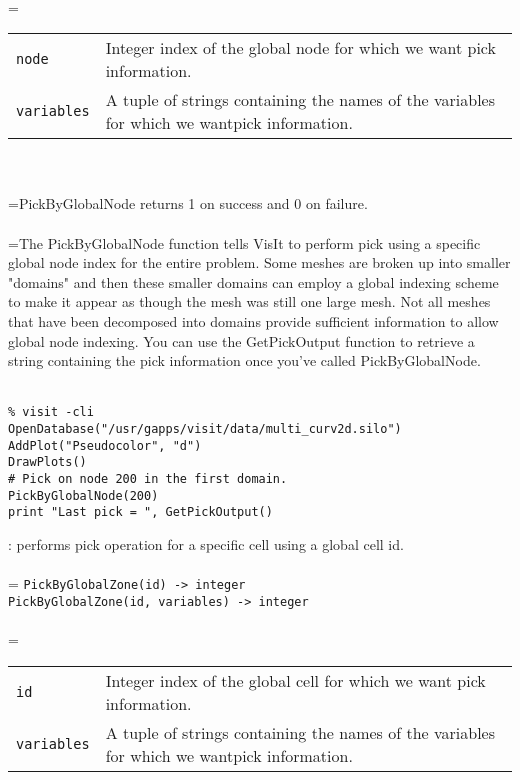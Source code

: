 \documentclass[10pt,a4paper]{report}
\begin{document}
 \\ 
\hangindent=\parindent 
\begin{tabular}{lp{9cm}}
\verb!node! & Integer index of the global node for which we want pick information. \\
\verb!variables! & A tuple of strings containing the names of the variables for which we wantpick information. \\
\end{tabular} \\[-2mm]


 \\ 
\hangindent=\parindent PickByGlobalNode returns 1 on success and 0 on failure. \\[-3mm] 

 \\ 
\hangindent=\parindent The PickByGlobalNode function tells VisIt to perform pick using a specific global node index for the entire problem. Some meshes are broken up into smaller "domains" and then these smaller domains can employ a global indexing scheme to make it appear as though the mesh was still one large mesh. Not all meshes that have been decomposed into domains provide sufficient information to allow global node indexing. You can use the GetPickOutput function to retrieve a string containing the pick information once you've called PickByGlobalNode. \\[-3mm] 

\\[-6mm]
\begin{verbatim}% visit -cli
OpenDatabase("/usr/gapps/visit/data/multi_curv2d.silo")
AddPlot("Pseudocolor", "d")
DrawPlots()
# Pick on node 200 in the first domain.
PickByGlobalNode(200)
print "Last pick = ", GetPickOutput()
\end{verbatim}
\newpage


{}
: performs pick operation for a specific cell using a global cell id.\\[-3mm]

 \\ 
\hangindent=\parindent 
\verb!PickByGlobalZone(id) -> integer!\\ 
\verb!PickByGlobalZone(id, variables) -> integer!\\ [-3mm]

 \\ 
\hangindent=\parindent 
\begin{tabular}{lp{9cm}}
\verb!id! & Integer index of the global cell for which we want pick information. \\
\verb!variables! & A tuple of strings containing the names of the variables for which we wantpick information. \\
\end{tabular} \\[-2mm]
\end{document}
